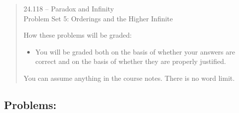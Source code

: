 \documentclass[12pt,a4paper]{article}
\begin{document}
\begin{quote}

\begin{center} {\large 24.118 -- Paradox and Infinity \\ \vspace{1mm}}
 {\large Problem Set 5: Orderings and the Higher Infinite\\ \vspace{1mm}}
 
\end{center}
\vspace{3mm}

\noindent How these problems will be graded:

\begin{itemize} 

\item You will be graded both on the basis of whether your answers are correct and on the basis of whether they are properly justified. 
\end{itemize} 

You can assume anything in the course notes. There is no word limit.


\end{quote}

\subsection*{Problems:}
\end{document}

